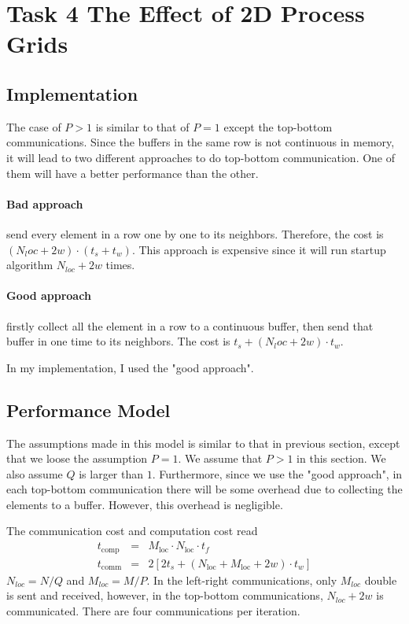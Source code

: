 \section{Task 4 The Effect of 2D Process Grids}

\subsection{Implementation}
The case of $P>1$ is similar to that of $P=1$ except the top-bottom communications. 
Since the buffers in the same row is not continuous in memory, it will lead to two different approaches to do top-bottom communication. 
One of them will have a better performance than the other. 
\paragraph{Bad approach } send every element in a row one by one to its neighbors. Therefore, the cost is $(N_loc + 2 w)\cdot (t_s + t_w)$.
This approach is expensive since it will run startup algorithm $N_{loc} + 2w$ times.
\paragraph{Good approach } firstly collect all the element in a row to a continuous buffer, then send that buffer in one time to its neighbors.
The cost is $t_s + (N_loc + 2 w) \cdot t_w$. 

In my implementation, I used the "good approach".

\subsection{Performance Model}
The assumptions made in this model is similar to that in previous section, except that we loose the assumption $P=1$.
We assume that $P>1$ in this section. We also assume $Q$ is larger than $1$. Furthermore, since we use the "good approach",
in each top-bottom communication there will be some overhead due to collecting the elements to a buffer. However, this
overhead is negligible.

The communication cost and computation cost read
\begin{eqnarray*}
	t_{\textrm{comp}} &=& M_{\textrm{loc}} \cdot N_{\textrm{loc}} \cdot t_f \\
	t_{\textrm{comm}} &=& 2 \left[ 2 t_s + \left( N_{\textrm{loc}} + M_{\textrm{loc}} + 2 w \right) \cdot t_w  \right] 
\end{eqnarray*}
$N_{loc} = N/Q$ and $M_{loc}= M/P$. In the left-right communications, only $M_{loc}$ double is sent and received, however, in
the top-bottom communications, $N_{loc} + 2 w$ is communicated. There are four communications per iteration.

